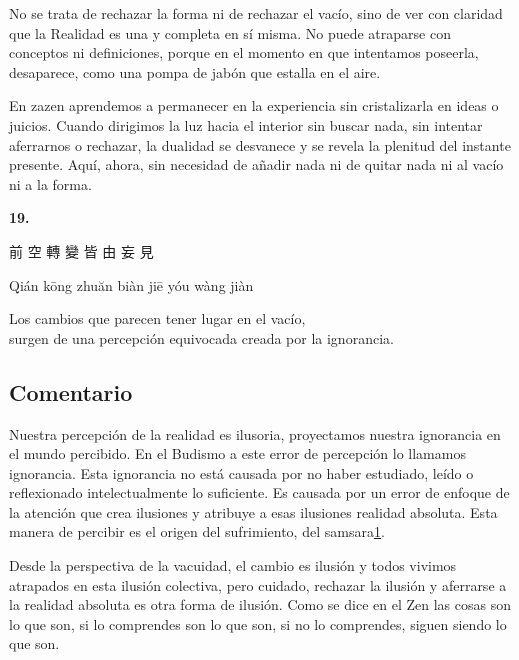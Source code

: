 \documentclass[
  a5paperpaper,
]{article}
\begin{document}
No se trata de rechazar la forma ni de rechazar el vacío, sino de ver
con claridad que la Realidad es una y completa en sí misma. No puede
atraparse con conceptos ni definiciones, porque en el momento en que
intentamos poseerla, desaparece, como una pompa de jabón que estalla en
el aire.

En zazen aprendemos a permanecer en la experiencia sin cristalizarla en
ideas o juicios. Cuando dirigimos la luz hacia el interior sin buscar
nada, sin intentar aferrarnos o rechazar, la dualidad se desvanece y se
revela la plenitud del instante presente. Aquí, ahora, sin necesidad de
añadir nada ni de quitar nada ni al vacío ni a la forma.

\hfill\break

\hypertarget{04}{}
\begin{verseblock}

\newpage

\begin{center}\textbf{19.}\end{center}

前 空 轉 變 皆 由 妄 見

Qián kōng zhuăn biàn jiē yóu wàng jiàn

Los cambios que parecen tener lugar en el vacío,\\
surgen de una percepción equivocada creada por la ignorancia.

\end{verseblock}

\hfill\break

\hypertarget{comentario-18}{%
\subsection{Comentario}\label{comentario-18}}

Nuestra percepción de la realidad es ilusoria, proyectamos nuestra
ignorancia en el mundo percibido. En el Budismo a este error de
percepción lo llamamos ignorancia. Esta ignorancia no está causada por
no haber estudiado, leído o reflexionado intelectualmente lo suficiente.
Es causada por un error de enfoque de la atención que crea ilusiones y
atribuye a esas ilusiones realidad absoluta. Esta manera de percibir es
el origen del sufrimiento, del
samsara\protect\hypertarget{ref1}{\protect\hyperlink{nota1}{1}}.

Desde la perspectiva de la vacuidad, el cambio es ilusión y todos
vivimos atrapados en esta ilusión colectiva, pero cuidado, rechazar la
ilusión y aferrarse a la realidad absoluta es otra forma de ilusión.
Como se dice en el Zen las cosas son lo que son, si lo comprendes son lo
que son, si no lo comprendes, siguen siendo lo que son.
\end{document}
